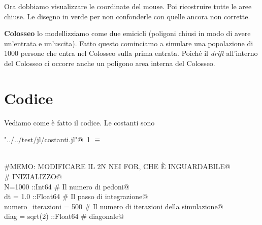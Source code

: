 \documentclass[]{article}
\begin{document}
Ora dobbiamo visualizzare le coordinate del mouse.
Poi ricostruire tutte le aree chiuse.
Le disegno in verde per non confonderle con quelle ancora non corrette.

{\bf Colosseo} lo modellizziamo come due emicicli (poligoni chiusi in modo di avere un'entrata e un'uscita).
Fatto questo cominciamo a simulare una popolazione di 1000 persone che entra nel Colosseo sulla prima entrata.
Poiché il {\sl drift} all'interno del Colosseo ci occorre anche un poligono area interna del Colosseo.
\section{Codice}
Vediamo come è fatto il codice.
Le costanti sono

\begin{flushleft} \small
\begin{minipage}{\linewidth} \label{scrap1}
\protect{}\verb@"../../test/jl/costanti.jl"@\nobreak\ {\footnotesize 1 }$\equiv$
\vspace{-1ex}
\begin{list}{}{} \item
\mbox{}\verb@@\\
\mbox{}\verb@\#MEMO: MODIFICARE IL 2N NEI FOR, CHE È INGUARDABILE@\\
\mbox{}\verb@\# INIZIALIZZO@\\
\mbox{}\verb@const N=1000 ::Int64                \# Il numero di pedoni@\\
\mbox{}\verb@const dt = 1.0 ::Float64               \# Il passo di integrazione@\\
\mbox{}\verb@const numero\_iterazioni = 500            \# Il numero di iterazioni della simulazione@\\
\mbox{}\verb@const diag = sqrt(2) ::Float64            \# diagonale@\\
\mbox{}\verb@@{\NWsep}
\end{list}
\vspace{-2ex}
\end{minipage}\\[4ex]
\end{flushleft}
\end{document}
